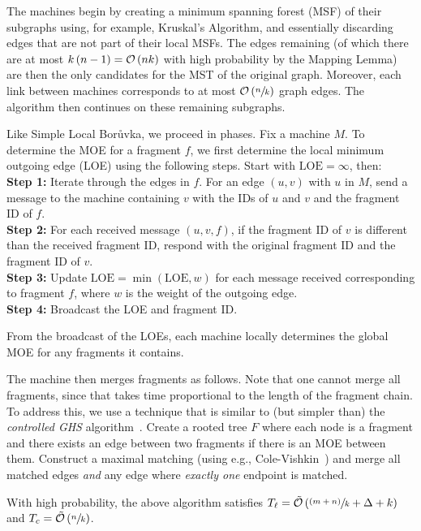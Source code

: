The machines begin by creating a minimum spanning forest (MSF) of their subgraphs using, for example, Kruskal's Algorithm, and essentially discarding edges that are not part of their local MSFs. The edges remaining (of which there are at most \(k\left(n - 1\right)=\mathcal{O}\left(nk\right)\) with high probability by the Mapping Lemma) are then the only candidates for the MST of the original graph. Moreover, each link between machines corresponds to at most \(\mathcal{O}\left(\sfrac{n}{k}\right)\) graph edges. The algorithm then continues on these remaining subgraphs.

Like Simple Local Bor\r{u}vka, we proceed in phases. Fix a machine \(M\). To determine the MOE for a fragment \(f\), we first determine the local minimum outgoing edge (LOE) using the following steps. Start with \(\mathrm{LOE}=\infty\), then:\\
\textbf{Step 1:} Iterate through the edges in \(f\). For an edge \((u, v)\) with \(u\) in \(M\), send a message to the machine containing \(v\) with the IDs of \(u\) and \(v\) and the fragment ID of \(f\).\\
\textbf{Step 2:} For each received message \((u, v, f)\), if the fragment ID of \(v\) is different than the received fragment ID, respond with the original fragment ID and the fragment ID of \(v\).\\
\textbf{Step 3:} Update \(\mathrm{LOE} = \min\left(\mathrm{LOE}, w\right)\) for each message received corresponding to fragment \(f\), where \(w\) is the weight of the outgoing edge.\\
\textbf{Step 4:} Broadcast the LOE and fragment ID.

From the broadcast of the LOEs,  each machine locally determines the global MOE for any fragments it contains.

The machine then merges fragments as follows. Note that one cannot merge all fragments,
since that takes time proportional to the length of the fragment chain. To address
this, we use a technique that is similar to (but simpler than) the \emph{controlled GHS} algorithm~\cite{dnabook}.
Create a rooted tree \(F\) where each node is a fragment and there exists an edge between two fragments if there is an MOE between them. Construct a maximal matching (using e.g., Cole-Vishkin~\cite{CV86}) and merge all matched edges \emph{and} any edge where \emph{exactly one} endpoint is matched.

\begin{theorem}
    \label{thm:ghs2}
    With high probability, the above algorithm satisfies $T_{\ell} = \tilde{\mathcal{O}}\left(\sfrac{(m + n)}{k} + \Delta + k\right)$ and $T_c = \tilde{\mathcal{O}}\left(\sfrac{n}{k}\right)$.
\end{theorem}

